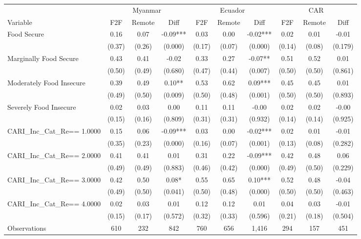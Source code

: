\begin{tabular}{l*{9}c}
\hline\hline
 & \multicolumn{3}{c}{Myanmar} & \multicolumn{3}{c}{Ecuador} & \multicolumn{3}{c}{CAR}\\ 
Variable & F2F & Remote & Diff & F2F & Remote & Diff & F2F & Remote & Diff \\
\hline
Food Secure&0.16&0.07&-0.09***&0.03&0.00&-0.02***&0.02&0.01&-0.01\\
&(0.37)&(0.26)&(0.000)&(0.17)&(0.07)&(0.000)&(0.14)&(0.08)&(0.179)\\
Marginally Food Secure&0.43&0.41&-0.02&0.33&0.27&-0.07**&0.51&0.52&0.01\\
&(0.50)&(0.49)&(0.680)&(0.47)&(0.44)&(0.007)&(0.50)&(0.50)&(0.861)\\
Moderately Food Insecure&0.39&0.49&0.10**&0.53&0.62&0.09***&0.45&0.45&0.01\\
&(0.49)&(0.50)&(0.009)&(0.50)&(0.48)&(0.001)&(0.50)&(0.50)&(0.893)\\
Severely Food Insecure&0.02&0.03&0.00&0.11&0.11&-0.00&0.02&0.02&-0.00\\
&(0.15)&(0.16)&(0.809)&(0.31)&(0.31)&(0.932)&(0.14)&(0.14)&(0.925)\\
CARI\_Inc\_Cat\_Re==     1.0000&0.15&0.06&-0.09***&0.03&0.00&-0.02***&0.02&0.01&-0.01\\
&(0.35)&(0.23)&(0.000)&(0.16)&(0.07)&(0.001)&(0.13)&(0.08)&(0.282)\\
CARI\_Inc\_Cat\_Re==     2.0000&0.41&0.41&0.01&0.31&0.22&-0.09***&0.42&0.48&0.06\\
&(0.49)&(0.49)&(0.883)&(0.46)&(0.42)&(0.000)&(0.49)&(0.50)&(0.229)\\
CARI\_Inc\_Cat\_Re==     3.0000&0.42&0.50&0.08*&0.55&0.65&0.10***&0.52&0.48&-0.04\\
&(0.49)&(0.50)&(0.041)&(0.50)&(0.48)&(0.000)&(0.50)&(0.50)&(0.463)\\
CARI\_Inc\_Cat\_Re==     4.0000&0.02&0.03&0.01&0.12&0.12&0.01&0.04&0.03&-0.01\\
&(0.15)&(0.17)&(0.572)&(0.32)&(0.33)&(0.596)&(0.21)&(0.18)&(0.504)\\
\hline
Observations & 610 & 232 & 842 & 760 & 656 & 1,416 & 294 & 157 & 451 \\
\hline\hline
\end{tabular}
